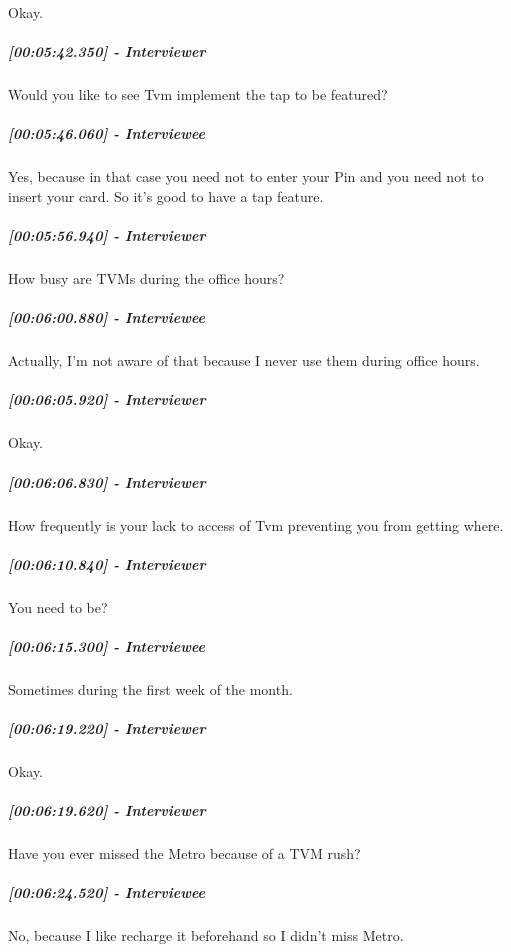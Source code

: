 \documentclass[a4paper,12pt]{article}
\begin{document}
Okay.

\hypertarget{interviewer-40}{%
\subparagraph{{[}00:05:42.350{]} - Interviewer}\label{interviewer-40}}

Would you like to see Tvm implement the tap to be featured?

\hypertarget{interviewee-27}{%
\subparagraph{{[}00:05:46.060{]} - Interviewee}\label{interviewee-27}}

Yes, because in that case you need not to enter your Pin and you need
not to insert your card. So it's good to have a tap feature.

\hypertarget{interviewer-41}{%
\subparagraph{{[}00:05:56.940{]} - Interviewer}\label{interviewer-41}}

How busy are TVMs during the office hours?

\hypertarget{interviewee-28}{%
\subparagraph{{[}00:06:00.880{]} - Interviewee}\label{interviewee-28}}

Actually, I'm not aware of that because I never use them during office
hours.

\hypertarget{interviewer-42}{%
\subparagraph{{[}00:06:05.920{]} - Interviewer}\label{interviewer-42}}

Okay.

\hypertarget{interviewer-43}{%
\subparagraph{{[}00:06:06.830{]} - Interviewer}\label{interviewer-43}}

How frequently is your lack to access of Tvm preventing you from getting
where.

\hypertarget{interviewer-44}{%
\subparagraph{{[}00:06:10.840{]} - Interviewer}\label{interviewer-44}}

You need to be?

\hypertarget{interviewee-29}{%
\subparagraph{{[}00:06:15.300{]} - Interviewee}\label{interviewee-29}}

Sometimes during the first week of the month.

\hypertarget{interviewer-45}{%
\subparagraph{{[}00:06:19.220{]} - Interviewer}\label{interviewer-45}}

Okay.

\hypertarget{interviewer-46}{%
\subparagraph{{[}00:06:19.620{]} - Interviewer}\label{interviewer-46}}

Have you ever missed the Metro because of a TVM rush?

\hypertarget{interviewee-30}{%
\subparagraph{{[}00:06:24.520{]} - Interviewee}\label{interviewee-30}}

No, because I like recharge it beforehand so I didn't miss Metro.
\end{document}
